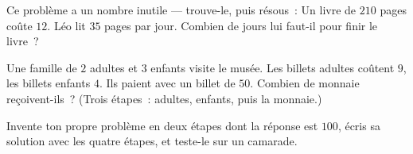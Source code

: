 \begin{exercise}[$\star$]\label{exo:g3:problems:9}
Ce problème a un nombre inutile --- trouve-le, puis résous~:
\guillemotleft{} Un livre de $210$ pages coûte $12$. Léo lit
$35$ pages par jour. Combien de jours lui faut-il pour finir le
livre~? \guillemotright{}
\end{exercise}

\begin{exercise}[$\star\star$]\label{exo:g3:problems:10}
\guillemotleft{} Une famille de $2$ adultes et $3$ enfants visite le
musée. Les billets adultes coûtent $9$, les billets enfants $4$.
Ils paient avec un billet de $50$. Combien de monnaie
reçoivent-ils~? \guillemotright{} (Trois étapes~: adultes,
enfants, puis la monnaie.)
\end{exercise}

\begin{exercise}[$\star\star$]\label{exo:g3:problems:11}
Invente ton propre problème en deux étapes dont la réponse
est $100$, écris sa solution avec les quatre étapes, et teste-le
sur un camarade.
\end{exercise}
